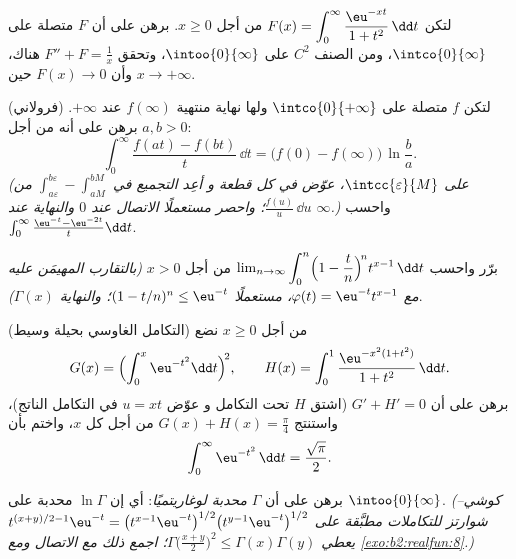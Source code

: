 \begin{exercise}[$\star\star$]\label{exo:b2:integration:5}
لتكن $F(x) = \displaystyle\int_0^{\infty} \frac{\eu^{-xt}}{1 +
t^2}\,\dd t$ من أجل $x \geq 0$. برهن على أن $F$ متصلة على
$\intco{0}{\infty}$، ومن الصنف $C^2$ على $\intoo{0}{\infty}$، وتحقق $F'' +
F = \frac1x$ هناك، وأن $F(x) \to 0$ حين $x \to +\infty$.
\end{exercise}

\begin{exercise}[$\star\star$]\label{exo:b2:integration:6}
(فرولاني) لتكن $f$ متصلة على $\intco{0}{+\infty}$ ولها نهاية
منتهية $f(\infty)$ عند $+\infty$. برهن على أنه من أجل $a, b > 0$:
\[
\int_0^{\infty} \frac{f(at) - f(bt)}{t}\,\dd t
= \bigl(f(0) - f(\infty)\bigr)\,\ln\frac ba .
\]
\emph{(على $\intcc{\varepsilon}{M}$، عوّض في كل قطعة و
أعِد التجميع في $\int_{a\varepsilon}^{b\varepsilon} -
\int_{aM}^{bM}$ من $\frac{f(u)}u\,\dd u$؛ واحصر مستعملًا
الاتصال عند $0$ والنهاية عند $\infty$.)} واحسب
$\int_0^\infty \frac{\eu^{-t} - \eu^{-2t}}{t}\dd t$.
\end{exercise}

\begin{exercise}[$\star\star$]\label{exo:b2:integration:7}
برّر واحسب $\lim_{n\to\infty} \displaystyle\int_0^n
\Bigl(1 - \frac tn\Bigr)^{\!n} t^{x-1}\,\dd t$ من أجل $x > 0$
\emph{(بالتقارب المهيمَن عليه مع $\varphi(t) = \eu^{-t}t^{x-1}$،
مستعملًا $(1 - t/n)^n \leq \eu^{-t}$؛ والنهاية $\Gamma(x)$)}.
\end{exercise}

\begin{exercise}[$\star\star\star$]\label{exo:b2:integration:8}
(التكامل الغاوسي بحيلة وسيط) من أجل $x \geq 0$ نضع
\[
G(x) = \Bigl(\int_0^x \eu^{-t^2}\dd t\Bigr)^{\!2},
\qquad
H(x) = \int_0^1 \frac{\eu^{-x^2(1+t^2)}}{1 + t^2}\,\dd t .
\]
برهن على أن $G' + H' = 0$ (اشتق $H$ تحت التكامل و
عوّض $u = xt$ في التكامل الناتج)، واستنتج $G(x) + H(x)
= \frac\pi4$ من أجل كل $x$، واختم بأن
\[
\int_0^{\infty} \eu^{-t^2}\,\dd t = \frac{\sqrt\pi}{2} .
\]
\end{exercise}

\begin{exercise}[$\star\star\star$]\label{exo:b2:integration:9}
برهن على أن $\Gamma$ \emph{محدبة لوغاريتميًا}: أي إن $\ln\Gamma$ محدبة على
$\intoo{0}{\infty}$. \emph{(كوشي--شوارتز للتكاملات مطبَّقة
على $t^{(x+y)/2 - 1}\eu^{-t} = \bigl(t^{x-1}\eu^{-t}\bigr)^{1/2}
\bigl(t^{y-1}\eu^{-t}\bigr)^{1/2}$ يعطي
$\Gamma\bigl(\frac{x+y}{2}\bigr)^2 \leq \Gamma(x)\Gamma(y)$؛
اجمع ذلك مع الاتصال ومع \cref{exo:b2:realfun:8}.)}
\end{exercise}

